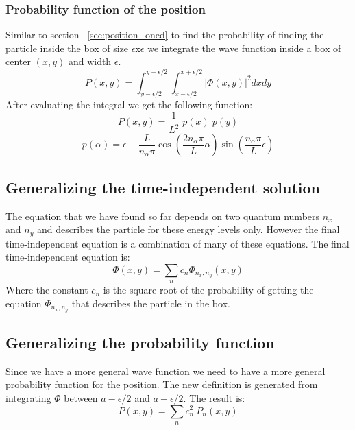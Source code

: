 \documentclass[a4paper, 10pt]{article}
\begin{document}
        \subsubsection{Probability function of the position}
        Similar to section ~\ref{sec:position_oned} to find the
        probability of finding the particle inside the box of size
        $\epsilon$x$\epsilon$ we integrate the wave function inside a
        box of center $(x,y)$ and width $\epsilon$.
        $$ P(x, y) = \int^{y+\epsilon/2}_{y-\epsilon/2}\int^{x+\epsilon/2}_{x-\epsilon/2}
          |\Phi(x, y)|^2 dx dy $$
        After evaluating the integral we get the following function:
        \begin{equation} \label{eq:position_twod_equation}
            P(x, y) = \frac{1}{L^2} \; p(x) \; p(y)
        \end{equation}
        $$
        p(\alpha) = \epsilon - \frac{L}{n_\alpha\pi} \cos\left( \frac{2n_\alpha\pi}{L}\alpha \right)
        \sin\left( \frac{n_\alpha\pi}{L} \epsilon\right)
        $$

        \subsection{Generalizing the time-independent solution}
        The equation that we have found so far depends on two quantum numbers
        $n_x$ and $n_y$ and describes the particle for these energy levels only.
        However the final time-independent equation is a combination of many of these
        equations. The final time-independent equation is:
        \begin{equation} \label{eq:general_position}
            \Phi(x,y) = \sum_{n} c_n \Phi_{n_x, n_y}(x,y)
        \end{equation}
        Where the constant $c_n$ is the square root of the probability of getting
        the equation $\Phi_{n_x, n_y}$ that describes the particle in the box.

        \subsection{Generalizing the probability function}
        Since we have a more general wave function we need to have a more general
        probability function for the position. The new definition is generated from
        integrating $\Phi$ between $a-\epsilon/2$ and $a+\epsilon/2$. The result is:
        $$ P(x, y) = \sum_{n} c^2_n \: P_n(x, y)$$
\end{document}
